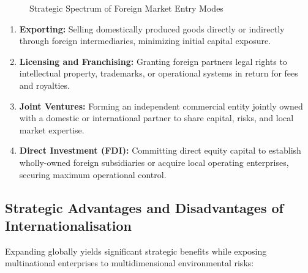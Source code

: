 \begin{figure}[htbp]
{%
    }
    \caption{Strategic Spectrum of Foreign Market Entry Modes}
    \label{fig:entry_modes_spectrum}
\end{figure}

\begin{enumerate}[leftmargin=*]
    \item \textbf{Exporting:} Selling domestically produced goods directly or indirectly through foreign intermediaries, minimizing initial capital exposure.
    \item \textbf{Licensing and Franchising:} Granting foreign partners legal rights to intellectual property, trademarks, or operational systems in return for fees and royalties.
    \item \textbf{Joint Ventures:} Forming an independent commercial entity jointly owned with a domestic or international partner to share capital, risks, and local market expertise.
    \item \textbf{Direct Investment (FDI):} Committing direct equity capital to establish wholly-owned foreign subsidiaries or acquire local operating enterprises, securing maximum operational control.
\end{enumerate}

\newpage
\subsection{Strategic Advantages and Disadvantages of Internationalisation}
Expanding globally yields significant strategic benefits while exposing multinational enterprises to multidimensional environmental risks:

